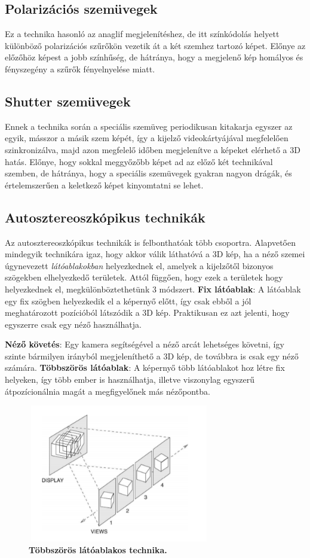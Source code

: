 \documentclass[12pt]{article}
\theoremstyle{plain}
\begin{document}
\subsection{Polarizációs szemüvegek}

Ez a technika hasonló az anaglif megjelenítéshez, de itt színkódolás helyett különböző polarizációs szűrőkön vezetik át a két szemhez tartozó képet. Előnye az előzőhöz képest a jobb színhűség, de hátránya, hogy a megjelenő kép homályos és fényszegény a szűrők fényelnyelése miatt.

\subsection{Shutter szemüvegek}

Ennek a technika során a speciális szemüveg periodikusan kitakarja egyszer az egyik, másszor a másik szem képét, így a kijelző videokártyájával megfelelően szinkronizálva, majd azon megfelelő időben megjelenítve a képeket elérhető a 3D hatás. Előnye, hogy sokkal meggyőzőbb képet ad az előző két technikával szemben, de hátránya, hogy a speciális szemüvegek gyakran nagyon drágák, és értelemszerűen a keletkező képet kinyomtatni se lehet. 
\subsection{Autosztereoszkópikus technikák}
Az autosztereoszkópikus technikák is felbonthatóak több csoportra. Alapvetően mindegyik technikára igaz, hogy akkor válik láthatóvá a 3D kép, ha a néző szemei úgynevezett \textit{látóablakokban} helyezkednek el, amelyek a kijelzőtől bizonyos szögekben elhelyezkedő területek. Attól függően, hogy ezek a területek hogy helyezkednek el, megkülönböztethetünk 3 módszert.
\textbf{ Fix látóablak}: A látóablak egy fix szögben helyezkedik el a képernyő előtt, így csak ebből a jól meghatározott pozícióból látszódik a 3D kép. Praktikusan ez azt jelenti, hogy egyszerre csak egy néző használhatja.   

\textbf{Néző követés}: Egy kamera segítségével a néző arcát lehetséges követni, így szinte bármilyen irányból megjeleníthető a 3D kép, de továbbra is csak egy néző számára.  
\textbf{Többszörös látóablak}: A képernyő több látóablakot hoz létre fix helyeken, így több ember is használhatja, illetve viszonylag egyszerű átpozícionálnia magát a megfigyelőnek más nézőpontba.  

\begin{figure}[H]
   \centering
   \includegraphics[width=8cm, height=6cm]{media/stereo_m.PNG}
   \caption{\textbf{Többszörös látóablakos technika.}}
   \label{fig:GeneralDiagram}
\end{figure}
\end{document}
